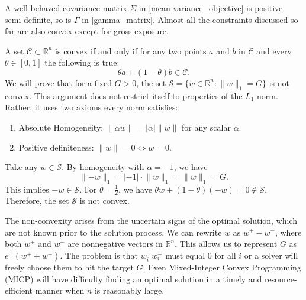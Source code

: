 \documentclass[11pt, letterpaper]{article}
\begin{document}
A well-behaved covariance matrix $\Sigma$ in \eqref{mean-variance_objective} is positive semi-definite, so is $\Gamma$ in
\eqref{gamma_matrix}. Almost all the constraints discussed so far are also convex except for gross exposure.

A set $\mathcal{C} \subset \mathds{R}^n$ is convex if and only if for any two points $a$ and $b$ in $\mathcal{C}$ and every
$\theta \in [0,1]$ the following is true:
\begin{equation}
	\theta a + (1 - \theta)b \in \mathcal{C}.
\end{equation}
We will prove that for a fixed $G > 0$, the set $\mathcal{S} = \{w\in \mathds{R}^n:\lVert w\rVert_1 = G\}$ is not convex.  This
argument does not restrict itself to properties of the $L_1$ norm. Rather, it uses two axioms every norm satisfies:
\begin{enumerate}
	\item Absolute Homogeneity: $\lVert\alpha w\rVert = |\alpha| \lVert w\rVert$ for any scalar $\alpha$.
	\item Positive definiteness: $\lVert w\rVert = 0 \Leftrightarrow w = 0$.
\end{enumerate}
Take any $w \in \mathcal{S}$. By homogeneity with $\alpha = -1$, we have
\begin{equation*}
	\lVert-w\rVert_1 = | -1|\cdot \lVert w\rVert_1 = \lVert w\rVert_1 = G.
\end{equation*}
This implies $-w \in \mathcal{S}$. For $\theta = \frac{1}{2}$, we have $\theta w + (1-\theta)(-w) = 0 \notin
\mathcal{S}$. Therefore, the set $\mathcal{S}$ is not convex.

The non-convexity arises from the uncertain signs of the optimal solution, which are not known prior to the solution process. We
can rewrite $w$ as $w^+-w^-$, where both $w^+$ and $w^-$ are nonnegative vectors in $\mathds{R}^n$. This allows us to represent
$G$ as $e^\top(w^++w^-)$. The problem is that $w_i^+w_i^-$ must equal $0$ for all $i$ or a solver will freely choose them to hit
the target $G$. Even Mixed-Integer Convex Programming (MICP) will have difficulty finding an optimal solution in a timely and
resource-efficient manner when $n$ is reasonably large.
\end{document}
